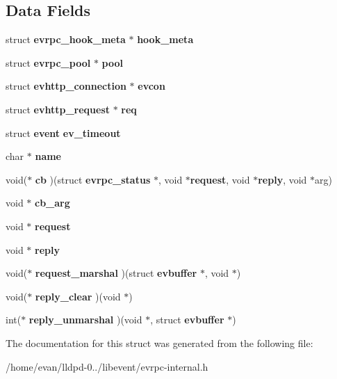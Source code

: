 \subsection*{\-Data \-Fields}
\begin{DoxyCompactItemize}
\item 
struct {\bf evrpc\-\_\-hook\-\_\-meta} $\ast$ {\bfseries hook\-\_\-meta}\label{structevrpc__request__wrapper_a2c900a2f27e1f4361e788f3599bbf99b}

\item 
struct {\bf evrpc\-\_\-pool} $\ast$ {\bfseries pool}\label{structevrpc__request__wrapper_a3519c39d58669fecd3334338e189508b}

\item 
struct {\bf evhttp\-\_\-connection} $\ast$ {\bfseries evcon}\label{structevrpc__request__wrapper_a507c84afa3bb93e17efc8aecd1bf18d2}

\item 
struct {\bf evhttp\-\_\-request} $\ast$ {\bfseries req}\label{structevrpc__request__wrapper_a27a6cc58bd947852de09feaa5a40f768}

\item 
struct {\bf event} {\bfseries ev\-\_\-timeout}\label{structevrpc__request__wrapper_af408d3914fac9f7e3eac3f35e7c18b5b}

\item 
char $\ast$ {\bfseries name}\label{structevrpc__request__wrapper_a5ac083a645d964373f022d03df4849c8}

\item 
void($\ast$ {\bfseries cb} )(struct {\bf evrpc\-\_\-status} $\ast$, void $\ast${\bf request}, void $\ast${\bf reply}, void $\ast$arg)\label{structevrpc__request__wrapper_a65342a98144393d6402f024af6dbbed4}

\item 
void $\ast$ {\bfseries cb\-\_\-arg}\label{structevrpc__request__wrapper_aa2a0fc874870115f7d31aabcbb53ec0b}

\item 
void $\ast$ {\bfseries request}\label{structevrpc__request__wrapper_a754b843e227c83c4fcbbd570c0828af5}

\item 
void $\ast$ {\bfseries reply}\label{structevrpc__request__wrapper_a3054b93eacc586713f60fe72fc620146}

\item 
void($\ast$ {\bfseries request\-\_\-marshal} )(struct {\bf evbuffer} $\ast$, void $\ast$)\label{structevrpc__request__wrapper_aca9ef157bef90129107d29baa7d4da4b}

\item 
void($\ast$ {\bfseries reply\-\_\-clear} )(void $\ast$)\label{structevrpc__request__wrapper_a36799ff300b3ebb4eafa8f380f0f39b4}

\item 
int($\ast$ {\bfseries reply\-\_\-unmarshal} )(void $\ast$, struct {\bf evbuffer} $\ast$)\label{structevrpc__request__wrapper_a513170785516440cf1d32cf0a5ea0961}

\end{DoxyCompactItemize}


\-The documentation for this struct was generated from the following file\-:\begin{DoxyCompactItemize}
\item 
/home/evan/lldpd-\/0../libevent/evrpc-\/internal.\-h\end{DoxyCompactItemize}
